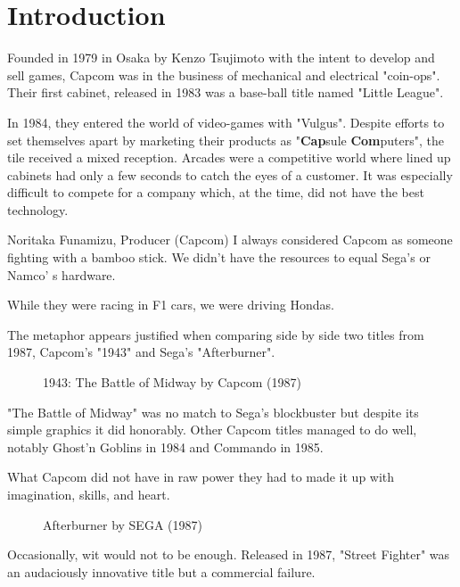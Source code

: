 \chapter{Introduction} 

Founded in 1979 in Osaka by Kenzo Tsujimoto with the intent to develop and sell games, Capcom was in the business of mechanical and electrical "coin-ops". Their first cabinet, released in 1983 was a base-ball title named "Little League".

In 1984, they entered the world of video-games with "Vulgus". Despite efforts to set themselves apart by marketing their products as "\textbf{Cap}sule \textbf{Com}puters", the tile received a mixed reception. Arcades were a competitive world where lined up cabinets had only a few seconds to catch the eyes of a customer. It was especially difficult to compete for a company which, at the time, did not have the best technology.

\begin{q}{Noritaka Funamizu, Producer (Capcom)}
I always considered Capcom as someone fighting with a bamboo stick. We didn't have the resources to equal Sega's or Namco'
s hardware. 

While they were racing in F1 cars, we were driving Hondas.
\end{q}

The metaphor appears justified when comparing side by side two titles from 1987, Capcom's "1943" and Sega's "Afterburner".

\begin{figure}[H]
\caption*{1943: The Battle of Midway by Capcom (1987)}
\end{figure}




"The Battle of Midway" was no match to Sega's blockbuster but despite its simple graphics it did honorably. Other Capcom titles managed to do well, notably Ghost’n Goblins in 1984 and Commando in 1985.

What Capcom did not have in raw power they had to made it up with imagination, skills, and heart. 

\begin{figure}[H]
\caption*{Afterburner by SEGA (1987)}
\end{figure}

Occasionally, wit would not to be enough. Released in 1987,  "Street Fighter" was an audaciously innovative title but a commercial failure.

